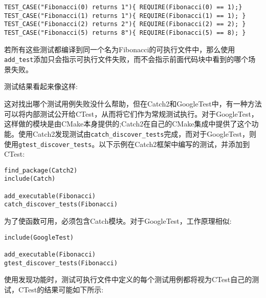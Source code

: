 \begin{lstlisting}[style=styleCXX]
TEST_CASE("Fibonacci(0) returns 1"){ REQUIRE(Fibonacci(0) == 1);}
TEST_CASE("Fibonacci(1) returns 1"){ REQUIRE(Fibonacci(1) == 1); }
TEST_CASE("Fibonacci(2) returns 2"){ REQUIRE(Fibonacci(2) == 2); }
TEST_CASE("Fibonacci(5) returns 8"){ REQUIRE(Fibonacci(5) == 8); }
\end{lstlisting}

若所有这些测试都编译到同一个名为Fibonacci的可执行文件中，那么使用\texttt{add\_test}添加只会指示可执行文件失败，而不会指示前面代码块中看到的哪个场景失败。

测试结果看起来像这样:


这对找出哪个测试用例失败没什么帮助，但在Catch2和GoogleTest中，有一种方法可以将内部测试公开给CTest，从而将它们作为常规测试执行。对于GoogleTest，这样做的模块是由CMake本身提供的;Catch2在自己的CMake集成中提供了这个功能。使用Catch2发现测试由\texttt{catch\_discover\_tests}完成，而对于GoogleTest，则使用\texttt{gtest\_discover\_tests}。以下示例在Catch2框架中编写的测试，并添加到CTest:

\begin{lstlisting}[style=styleCMake]
find_package(Catch2)
include(Catch)

add_executable(Fibonacci)
catch_discover_tests(Fibonacci)
\end{lstlisting}

为了使函数可用，必须包含Catch模块。对于GoogleTest，工作原理相似:

\begin{lstlisting}[style=styleCMake]
include(GoogleTest)

add_executable(Fibonacci)
gtest_discover_tests(Fibonacci)
\end{lstlisting}

使用发现功能时，测试可执行文件中定义的每个测试用例都将视为CTest自己的测试，CTest的结果可能如下所示:


